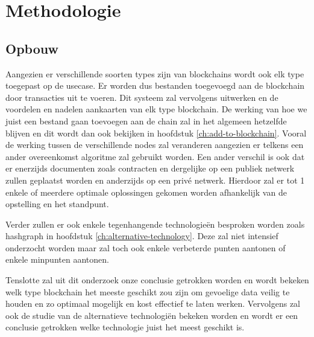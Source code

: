 
\chapter{Methodologie}
\label{ch:methodologie}


\section{Opbouw}
Aangezien er verschillende soorten types zijn van blockchains wordt ook elk type toegepast op de usecase. Er worden dus bestanden toegevoegd aan de blockchain door transacties uit te voeren. Dit systeem zal vervolgens uitwerken en de voordelen en nadelen aankaarten van elk type blockchain. De werking van hoe we juist een bestand gaan toevoegen aan de chain zal in het algemeen hetzelfde blijven en dit wordt dan ook bekijken in hoofdstuk \ref{ch:add-to-blockchain}. Vooral de werking tussen de verschillende nodes zal veranderen aangezien er telkens een ander overeenkomst algoritme zal gebruikt worden. Een ander verschil is ook dat er enerzijds documenten zoals contracten en dergelijke op een publiek netwerk zullen geplaatst worden en anderzijds op een privé netwerk. Hierdoor zal er tot 1 enkele of meerdere optimale oplossingen gekomen worden afhankelijk van de opstelling en het standpunt.

Verder zullen er ook enkele tegenhangende technologieën besproken worden zoals hashgraph in hoofdstuk \ref{ch:alternative-technology}. Deze zal niet intensief onderzocht worden maar zal toch ook enkele verbeterde punten aantonen of enkele minpunten aantonen. 

Tenslotte zal uit dit onderzoek onze conclusie getrokken worden en wordt bekeken welk type blockchain het meeste geschikt zou zijn om gevoelige data veilig te houden en zo optimaal mogelijk en kost effectief te laten werken. Vervolgens zal  ook de studie van de alternatieve technologiën bekeken worden en wordt er een conclusie getrokken welke technologie juist het meest geschikt is. 



